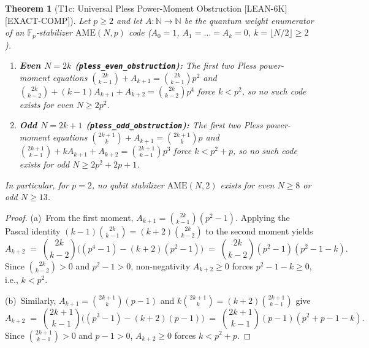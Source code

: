 \documentclass[11pt,reqno]{amsart}
\newtheorem{theorem}{Theorem}[section]
\theoremstyle{definition}
\newcommand{\FF}{\mathbb{F}}
\newcommand{\AME}{\mathrm{AME}}
\newcommand{\lid}[1]{{\footnotesize\nolinkurl{#1}}}
\newcommand{\tagL}{\textsf{\footnotesize[LEAN-6K]}}
\newcommand{\tagE}{\textsf{\footnotesize[EXACT-COMP]}}
\begin{document}
\begin{theorem}[T1c: Universal Pless Power-Moment Obstruction \tagL\,\tagE]
\label{thm:t1c}
Let $p \ge 2$ and let $A : \mathbb{N} \to \mathbb{N}$ be the quantum weight enumerator of
an $\FF_p$-stabilizer $\AME(N, p)$ code ($A_0 = 1$, $A_1 = \dots = A_k = 0$, $k = \lfloor
N/2 \rfloor \ge 2$).
\begin{enumerate}[label=(\alph*)]
  \item \textbf{Even $N = 2k$ (\lid{pless_even_obstruction}):} The first two Pless
    power-moment equations $\binom{2k}{k-1} + A_{k+1} = \binom{2k}{k-1} p^2$ and
    $\binom{2k}{k-2} + (k-1)A_{k+1} + A_{k+2} = \binom{2k}{k-2} p^4$ force $k < p^2$,
    so no such code exists for even $N \ge 2p^2$.
  \item \textbf{Odd $N = 2k+1$ (\lid{pless_odd_obstruction}):} The first two Pless
    power-moment equations $\binom{2k+1}{k} + A_{k+1} = \binom{2k+1}{k} p$ and
    $\binom{2k+1}{k-1} + k A_{k+1} + A_{k+2} = \binom{2k+1}{k-1} p^3$ force $k < p^2 + p$,
    so no such code exists for odd $N \ge 2p^2 + 2p + 1$.
\end{enumerate}
In particular, for $p = 2$, no qubit stabilizer $\AME(N, 2)$ exists for even $N \ge 8$ or
odd $N \ge 13$.
\end{theorem}

\begin{proof}
(a)~From the first moment, $A_{k+1} = \binom{2k}{k-1}(p^2 - 1)$. Applying the Pascal
identity $(k-1)\binom{2k}{k-1} = (k+2)\binom{2k}{k-2}$ to the second moment yields
\[
  A_{k+2}
  \;=\; \binom{2k}{k-2}\big((p^4 - 1) - (k+2)(p^2 - 1)\big)
  \;=\; \binom{2k}{k-2}(p^2 - 1)(p^2 - 1 - k).
\]
Since $\binom{2k}{k-2} > 0$ and $p^2 - 1 > 0$, non-negativity $A_{k+2} \ge 0$ forces
$p^2 - 1 - k \ge 0$, i.e., $k < p^2$.

(b)~Similarly, $A_{k+1} = \binom{2k+1}{k}(p - 1)$ and $k\binom{2k+1}{k} =
(k+2)\binom{2k+1}{k-1}$ give
\[
  A_{k+2}
  \;=\; \binom{2k+1}{k-1}\big((p^3 - 1) - (k+2)(p - 1)\big)
  \;=\; \binom{2k+1}{k-1}(p - 1)(p^2 + p - 1 - k).
\]
Since $\binom{2k+1}{k-1} > 0$ and $p - 1 > 0$, $A_{k+2} \ge 0$ forces $k < p^2 + p$.
\end{proof}
\end{document}
